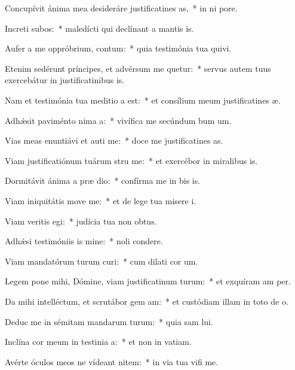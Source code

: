 \item Concupívit ánima mea desideráre justificatines as,~* in ni pore.
\item Increti subos:~* maledícti qui declínant a mantis is.
\item Aufer a me oppróbrium,  contum:~* quia testimónia tua quivi.
\item Etenim sedérunt príncipes, et advérsum me quetur:~* servus autem tuus exercebátur in justificatinibus is.
\item Nam et testimónia tua meditio a est:~* et consílium meum justificatines æ.
\item Adhǽsit paviménto nima a:~* vivífica me secúndum bum um.
\item Vias meas enuntiávi et auti me:~* doce me justificatines as.
\item Viam justificatiónum tuárum stru me:~* et exercébor in miralibus is.
\item Dormitávit ánima a præ dio:~* confírma me in bis is.
\item Viam iniquitátis move  me:~* et de lege tua misere i.
\item Viam veritis egi:~* judícia tua non  obtus.
\item Adhǽsi testimóniis is mine:~* noli  condere.
\item Viam mandatórum turum curi:~* cum dilati cor um.
\item Legem pone mihi, Dómine, viam justificatinum turum:~* et exquíram am per.
\item Da mihi intelléctum, et scrutábor gem am:~* et custódiam illam in toto de o.
\item Deduc me in sémitam mandarum turum:~* quia sam lui.
\item Inclína cor meum in testinia a:~* et non in vatiam.
\item Avérte óculos meos ne vídeant nitem:~* in via tua vifi me.
